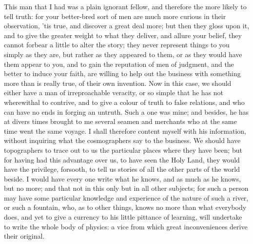 \documentclass[twocolumn]{article}
\begin{document}
	This man that I had was a plain ignorant fellow, and therefore the more likely to tell truth: for your better-bred sort of men are much more curious in their observation, ’tis true, and discover a great deal more; but then they gloss upon it, and to give the greater weight to what they deliver, and allure your belief, they cannot forbear a little to alter the story; they never represent things to you simply as they are, but rather as they appeared to them, or as they would have them appear to you, and to gain the reputation of men of judgment, and the better to induce your faith, are willing to help out the business with something more than is really true, of their own invention. Now in this case, we should either have a man of irreproachable veracity, or so simple that he has not wherewithal to contrive, and to give a colour of truth to false relations, and who can have no ends in forging an untruth. Such a one was mine; and besides, he has at divers times brought to me several seamen and merchants who at the same time went the same voyage. I shall therefore content myself with his information, without inquiring what the cosmographers say to the business. We should have topographers to trace out to us the particular places where they have been; but for having had this advantage over us, to have seen the Holy Land, they would have the privilege, forsooth, to tell us stories of all the other parts of the world beside. I would have every one write what he knows, and as much as he knows, but no more; and that not in this only but in all other subjects; for such a person may have some particular knowledge and experience of the nature of such a river, or such a fountain, who, as to other things, knows no more than what everybody does, and yet to give a currency to his little pittance of learning, will undertake to write the whole body of physics: a vice from which great inconveniences derive their original.
\end{document}
